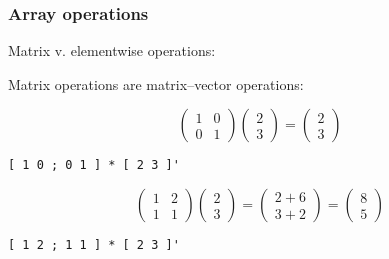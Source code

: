 \documentclass[11pt]{beamer}
\begin{document}
\begin{frame}[fragile]
  \frametitle{Array operations}
  \Enlarge

  \begin{enumerate}
  \myitem  Matrix v. elementwise operations:
    \begin{enumerate}
    \mysubitem  Matrix operations are matrix--vector operations:
    \end{enumerate}
  \end{enumerate}
  $$
\left( \begin{array}{cc}
  1 & 0 \\
  0 & 1
\end{array} \right)
\left( \begin{array}{c}
  2 \\
  3
\end{array} \right)
=
\left( \begin{array}{c}
  2 \\
  3
\end{array} \right)
  $$
  \pause
  \begin{Verbatim}
[ 1 0 ; 0 1 ] * [ 2 3 ]'
  \end{Verbatim}
  \pause
  $$
\left( \begin{array}{cc}
  1 & 2 \\
  1 & 1
\end{array} \right)
\left( \begin{array}{c}
  2 \\
  3
\end{array} \right)
=
\left( \begin{array}{c}
  2+6 \\
  3+2
\end{array} \right)
=
\left( \begin{array}{c}
  8 \\
  5
\end{array} \right)
  $$
  \pause
  \begin{Verbatim}
[ 1 2 ; 1 1 ] * [ 2 3 ]'
  \end{Verbatim}
\end{frame}
\end{document}
